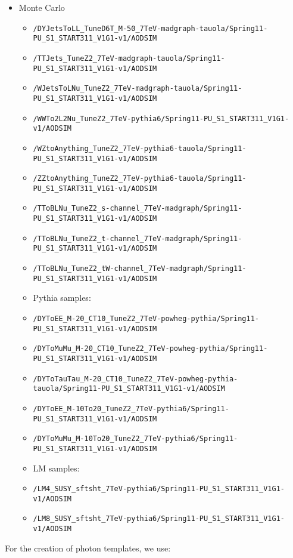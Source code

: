 \begin{itemize}
\item Monte Carlo
  \begin{itemize} 
  \item \verb=/DYJetsToLL_TuneD6T_M-50_7TeV-madgraph-tauola/Spring11-PU_S1_START311_V1G1-v1/AODSIM=
  \item \verb=/TTJets_TuneZ2_7TeV-madgraph-tauola/Spring11-PU_S1_START311_V1G1-v1/AODSIM=
  \item \verb=/WJetsToLNu_TuneZ2_7TeV-madgraph-tauola/Spring11-PU_S1_START311_V1G1-v1/AODSIM=
  \item \verb=/WWTo2L2Nu_TuneZ2_7TeV-pythia6/Spring11-PU_S1_START311_V1G1-v1/AODSIM=
  \item \verb=/WZtoAnything_TuneZ2_7TeV-pythia6-tauola/Spring11-PU_S1_START311_V1G1-v1/AODSIM=
  \item \verb=/ZZtoAnything_TuneZ2_7TeV-pythia6-tauola/Spring11-PU_S1_START311_V1G1-v1/AODSIM=
  \item \verb=/TToBLNu_TuneZ2_s-channel_7TeV-madgraph/Spring11-PU_S1_START311_V1G1-v1/AODSIM=
  \item \verb=/TToBLNu_TuneZ2_t-channel_7TeV-madgraph/Spring11-PU_S1_START311_V1G1-v1/AODSIM=
  \item \verb=/TToBLNu_TuneZ2_tW-channel_7TeV-madgraph/Spring11-PU_S1_START311_V1G1-v1/AODSIM=
  \item Pythia samples:
  \item \verb=/DYToEE_M-20_CT10_TuneZ2_7TeV-powheg-pythia/Spring11-PU_S1_START311_V1G1-v1/AODSIM=
  \item \verb=/DYToMuMu_M-20_CT10_TuneZ2_7TeV-powheg-pythia/Spring11-PU_S1_START311_V1G1-v1/AODSIM=
  \item \verb=/DYToTauTau_M-20_CT10_TuneZ2_7TeV-powheg-pythia-tauola/Spring11-PU_S1_START311_V1G1-v1/AODSIM=
  \item \verb=/DYToEE_M-10To20_TuneZ2_7TeV-pythia6/Spring11-PU_S1_START311_V1G1-v1/AODSIM=
  \item \verb=/DYToMuMu_M-10To20_TuneZ2_7TeV-pythia6/Spring11-PU_S1_START311_V1G1-v1/AODSIM=
  \item LM samples:
  \item \verb=/LM4_SUSY_sftsht_7TeV-pythia6/Spring11-PU_S1_START311_V1G1-v1/AODSIM=
  \item \verb=/LM8_SUSY_sftsht_7TeV-pythia6/Spring11-PU_S1_START311_V1G1-v1/AODSIM=
  \end{itemize}
\end{itemize}

For the creation of photon templates, we use:

